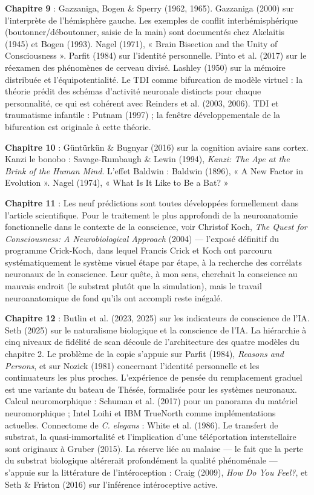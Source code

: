 \documentclass[11pt, twoside, openright]{book}
\begin{document}
\textbf{Chapitre 9} : Gazzaniga, Bogen \& Sperry (1962, 1965). Gazzaniga (2000) sur l'interprète de l'hémisphère gauche. Les exemples de conflit interhémisphérique (boutonner/\allowbreak{}déboutonner, saisie de la main) sont documentés chez Akelaitis (1945) et Bogen (1993). Nagel (1971), « Brain Bisection and the Unity of Consciousness ». Parfit (1984) sur l'identité personnelle. Pinto et al. (2017) sur le réexamen des phénomènes de cerveau divisé. Lashley (1950) sur la mémoire distribuée et l'équipotentialité. Le TDI comme bifurcation de modèle virtuel : la théorie prédit des schémas d'activité neuronale distincts pour chaque personnalité, ce qui est cohérent avec Reinders et al. (2003, 2006). TDI et traumatisme infantile : Putnam (1997) ; la fenêtre développementale de la bifurcation est originale à cette théorie.

\textbf{Chapitre 10} : Güntürkün \& Bugnyar (2016) sur la cognition aviaire sans cortex. Kanzi le bonobo : Savage-Rumbaugh \& Lewin (1994), \textit{Kanzi: The Ape at the Brink of the Human Mind}. L'effet Baldwin : Baldwin (1896), « A New Factor in Evolution ». Nagel (1974), « What Is It Like to Be a Bat? »

\textbf{Chapitre 11} : Les neuf prédictions sont toutes développées formellement dans l'article scientifique. Pour le traitement le plus approfondi de la neuroanatomie fonctionnelle dans le contexte de la conscience, voir Christof Koch, \textit{The Quest for Consciousness: A Neurobiological Approach} (2004) --- l'exposé définitif du programme Crick-Koch, dans lequel Francis Crick et Koch ont parcouru systématiquement le système visuel étape par étape, à la recherche des corrélats neuronaux de la conscience. Leur quête, à mon sens, cherchait la conscience au mauvais endroit (le substrat plutôt que la simulation), mais le travail neuroanatomique de fond qu'ils ont accompli reste inégalé.

\textbf{Chapitre 12} : Butlin et al. (2023, 2025) sur les indicateurs de conscience de l'IA. Seth (2025) sur le naturalisme biologique et la conscience de l'IA. La hiérarchie à cinq niveaux de fidélité de scan découle de l'architecture des quatre modèles du chapitre 2. Le problème de la copie s'appuie sur Parfit (1984), \textit{Reasons and Persons}, et sur Nozick (1981) concernant l'identité personnelle et les continuateurs les plus proches. L'expérience de pensée du remplacement graduel est une variante du bateau de Thésée, formalisée pour les systèmes neuronaux. Calcul neuromorphique : Schuman et al. (2017) pour un panorama du matériel neuromorphique ; Intel Loihi et IBM TrueNorth comme implémentations actuelles. Connectome de \textit{C. elegans} : White et al. (1986). Le transfert de substrat, la quasi-immortalité et l'implication d'une téléportation interstellaire sont originaux à Gruber (2015). La réserve liée au malaise --- le fait que la perte du substrat biologique altérerait profondément la qualité phénoménale --- s'appuie sur la littérature de l'intéroception : Craig (2009), \textit{How Do You Feel?}, et Seth \& Friston (2016) sur l'inférence intéroceptive active.
\end{document}
